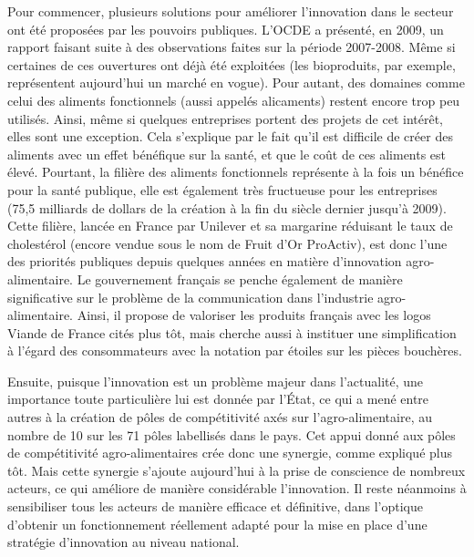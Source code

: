 \documentclass[a4paper,10pt]{report}
\begin{document}
			Pour commencer, plusieurs solutions pour améliorer l’innovation dans le secteur ont été proposées par les pouvoirs publiques. L’OCDE a présenté, en 2009, un rapport \cite{OECD} faisant suite à des observations faites sur la période 2007-2008. Même si certaines de ces ouvertures ont déjà été exploitées (les bioproduits, par exemple, représentent aujourd’hui un marché en vogue). Pour autant, des domaines comme celui des aliments fonctionnels (aussi appelés alicaments) restent encore trop peu utilisés. Ainsi, même si quelques entreprises portent des projets de cet intérêt, elles sont une exception. Cela s’explique par le fait qu’il est difficile de créer des aliments avec un effet bénéfique sur la santé, et que le coût de ces aliments est élevé. Pourtant, la filière des aliments fonctionnels représente à la fois un bénéfice pour la santé publique, elle est également très fructueuse pour les entreprises (75,5 milliards de dollars de la création à la fin du siècle dernier jusqu’à 2009). Cette filière, lancée en France par Unilever et sa margarine réduisant le taux de cholestérol (encore vendue sous le nom de Fruit d’Or ProActiv)\cite{FruitDOr}, est donc l’une des priorités publiques depuis quelques années en matière d’innovation agro-alimentaire. Le gouvernement français se penche également de manière significative sur le problème de la communication dans l’industrie agro-alimentaire. Ainsi, il propose de valoriser les produits français avec les logos Viande de France cités plus tôt, mais cherche aussi à instituer une simplification à l’égard des consommateurs avec la notation par étoiles sur les pièces bouchères\cite{EtoilesViande}. 

			Ensuite, puisque l’innovation est un problème majeur dans l’actualité, une importance toute particulière lui est donnée par l’État, ce qui a mené entre autres à la création de pôles de compétitivité axés sur l’agro-alimentaire, au nombre de 10 sur les 71 pôles labellisés dans le pays\cite{CompetitiviteGouv}. Cet appui donné aux pôles de compétitivité agro-alimentaires crée donc une synergie, comme expliqué plus tôt. Mais cette synergie s’ajoute aujourd’hui à la prise de conscience de nombreux acteurs, ce qui améliore de manière considérable l’innovation. Il reste néanmoins à sensibiliser tous les acteurs de manière efficace et définitive, dans l’optique d’obtenir un fonctionnement réellement adapté pour la mise en place d’une stratégie d’innovation au niveau national.
\end{document}
